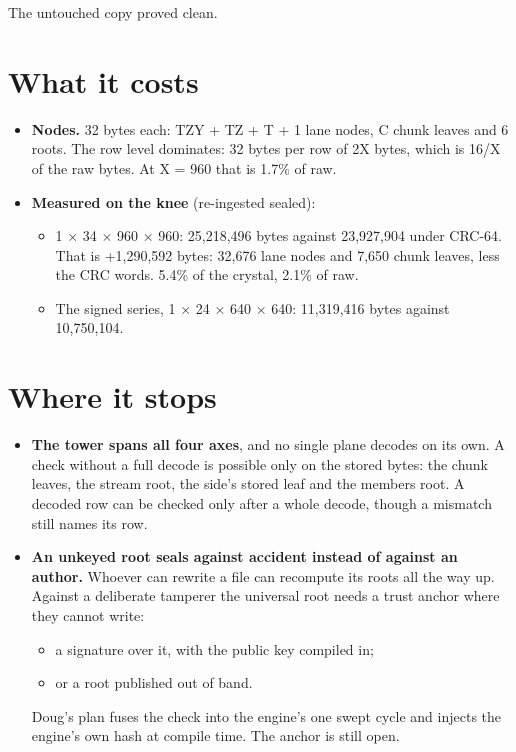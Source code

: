 The untouched copy proved clean.

\section{\texorpdfstring{What it costs}{What it costs}}

\begin{itemize}
\item \textbf{Nodes.} 32 bytes each: TZY + TZ + T + 1 lane nodes, C chunk leaves and 6 roots. The row level dominates: 32 bytes per row of 2X bytes, which is 16/X of the raw bytes. At X = 960 that is 1.7\% of raw.
\item \textbf{Measured on the knee} (re-ingested sealed):

\begin{itemize}
\item 1 × 34 × 960 × 960: 25,218,496 bytes against 23,927,904 under CRC-64. That is +1,290,592 bytes: 32,676 lane nodes and 7,650 chunk leaves, less the CRC words. 5.4\% of the crystal, 2.1\% of raw.
\item The signed series, 1 × 24 × 640 × 640: 11,319,416 bytes against 10,750,104.
\end{itemize}
\end{itemize}

\section{\texorpdfstring{Where it stops}{Where it stops}}

\begin{itemize}
\item \textbf{The tower spans all four axes}, and no single plane decodes on its own. A check without a full decode is possible only on the stored bytes: the chunk leaves, the stream root, the side's stored leaf and the members root. A decoded row can be checked only after a whole decode, though a mismatch still names its row.
\item \textbf{An unkeyed root seals against accident instead of against an author.} Whoever can rewrite a file can recompute its roots all the way up. Against a deliberate tamperer the universal root needs a trust anchor where they cannot write:

\begin{itemize}
\item a signature over it, with the public key compiled in;
\item or a root published out of band.
\end{itemize}

Doug's plan fuses the check into the engine's one swept cycle and injects the engine's own hash at compile time. The anchor is still open.
\end{itemize}

